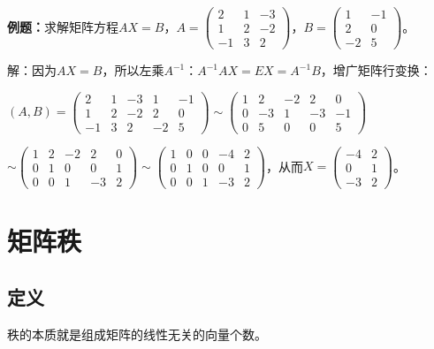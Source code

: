 \documentclass[UTF8, 12pt]{ctexart}
\begin{document}
\textbf{例题：}求解矩阵方程$AX=B$，$A=\left(\begin{array}{ccc}
2 & 1 & -3 \\
1 & 2 & -2 \\
-1 & 3 & 2
\end{array}\right)$，$B=\left(\begin{array}{cc}
1 & -1 \\
2 & 0 \\
-2 & 5
\end{array}\right)$。\medskip

解：因为$AX=B$，所以左乘$A^{-1}$：$A^{-1}AX=EX=A^{-1}B$，增广矩阵行变换：

$(A,B)=\left(\begin{array}{ccccc}
2 & 1 & -3 & 1 & -1 \\
1 & 2 & -2 & 2 & 0 \\
-1 & 3 & 2 & -2 & 5
\end{array}\right)\sim\left(\begin{array}{ccccc}
1 & 2 & -2 & 2 & 0 \\
0 & -3 & 1 & -3 & -1 \\
0 & 5 & 0 & 0 & 5
\end{array}\right)$

$\sim\left(\begin{array}{ccccc}
1 & 2 & -2 & 2 & 0 \\
0 & 1 & 0 & 0 & 1 \\
0 & 0 & 1 & -3 & 2
\end{array}\right)\sim\left(\begin{array}{ccccc}
1 & 0 & 0 & -4 & 2 \\
0 & 1 & 0 & 0 & 1 \\
0 & 0 & 1 & -3 & 2
\end{array}\right)$，从而$X=\left(\begin{array}{cc}
-4 & 2 \\
0 & 1 \\
-3 & 2
\end{array}\right)$。

\section{矩阵秩}

\subsection{定义}

秩的本质就是组成矩阵的线性无关的向量个数。
\end{document}
